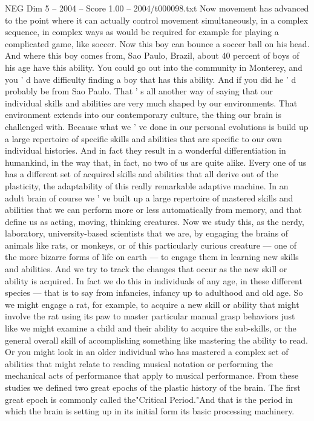 \begin{textsample}{NEG Dim 5 – 2004 – Score 1.00 – 2004/t000098.txt}
Now movement has advanced to the point where it can actually control movement simultaneously, in a complex sequence, in complex ways as would be required for example for playing a complicated game, like soccer.
Now this boy can bounce a soccer ball on his head.
And where this boy comes from, Sao Paulo, Brazil, about 40 percent of boys of his age have this ability.
You could go out into the community in Monterey, and you ' d have difficulty finding a boy that has this ability.
And if you did he ' d probably be from Sao Paulo.
That ' s all another way of saying that our individual skills and abilities are very much shaped by our environments.
That environment extends into our contemporary culture, the thing our brain is challenged with.
Because what we ' ve done in our personal evolutions is build up a large repertoire of specific skills and abilities that are specific to our own individual histories.
And in fact they result in a wonderful differentiation in humankind, in the way that, in fact, no two of us are quite alike.
Every one of us has a different set of acquired skills and abilities that all derive out of the plasticity, the adaptability of this really remarkable adaptive machine.
In an adult brain of course we ' ve built up a large repertoire of mastered skills and abilities that we can perform more or less automatically from memory, and that define us as acting, moving, thinking creatures.
Now we study this, as the nerdy, laboratory, university-based scientists that we are, by engaging the brains of animals like rats, or monkeys, or of this particularly curious creature — one of the more bizarre forms of life on earth — to engage them in learning new skills and abilities.
And we try to track the changes that occur as the new skill or ability is acquired.
In fact we do this in individuals of any age, in these different species — that is to say from infancies, infancy up to adulthood and old age.
So we might engage a rat, for example, to acquire a new skill or ability that might involve the rat using its paw to master particular manual grasp behaviors just like we might examine a child and their ability to acquire the sub-skills, or the general overall skill of accomplishing something like mastering the ability to read.
Or you might look in an older individual who has mastered a complex set of abilities that might relate to reading musical notation or performing the mechanical acts of performance that apply to musical performance.
From these studies we defined two great epochs of the plastic history of the brain.
The first great epoch is commonly called the"Critical Period."And that is the period in which the brain is setting up in its initial form its basic processing machinery.

\end{textsample}
